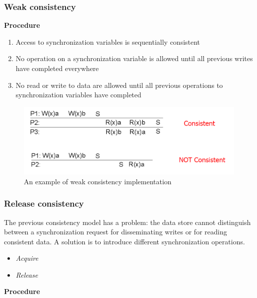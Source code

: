 \subsubsection{Weak consistency}

\textbf{Procedure}
\begin{enumerate}
    \def\labelenumi{\arabic{enumi}.}
    \itemsep1pt\parskip0pt
    \item
      Access to synchronization variables is sequentially consistent
    \item
      No operation on a synchronization variable is allowed until all
      previous writes have completed everywhere
    \item
      No read or write to data are allowed until all previous operations to
      synchronization variables have completed
\end{enumerate}

\begin{figure}[htbp]
    \centering
    \includegraphics[width=\textwidth]{src/images/consistency-replication/weak-consistency.png}
    \caption{An example of weak consistency implementation}
\end{figure}

\subsubsection{Release consistency}

The previous consistency model has a problem: the data store cannot distinguish between a
synchronization request for disseminating writes or for reading consistent data. A solution is
to introduce different synchronization operations.

\begin{itemize}
    \itemsep1pt\parskip0pt
    \item
      \emph{Acquire}
    \item
      \emph{Release}
\end{itemize}

\textbf{Procedure}

